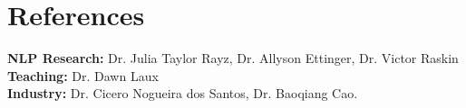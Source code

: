 \documentclass[11pt]{article}
\begin{document}
\section*{References}
\textbf{NLP Research:} Dr. Julia Taylor Rayz, Dr. Allyson Ettinger, Dr. Victor Raskin\\
\textbf{Teaching:} Dr. Dawn Laux\\
\textbf{Industry:} Dr. Cicero Nogueira dos Santos, Dr. Baoqiang Cao.



\end{document}

